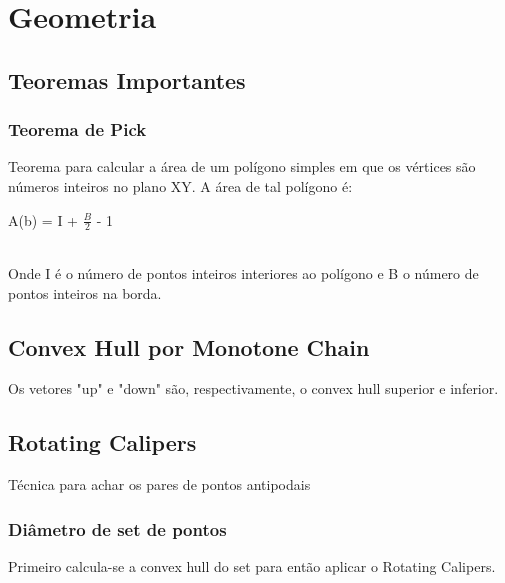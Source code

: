 \section{Geometria}

\subsection{Teoremas Importantes}

\subsubsection{Teorema de Pick}
Teorema para calcular a \'{a}rea de um pol\'{i}gono simples em que os v\'{e}rtices são n\'{u}meros inteiros no plano XY. A \'{a}rea de tal pol\'{i}gono é: 
\\\centerline{A(b) = I + $\frac{B}{2}$ - 1}
\\Onde I \'{e} o n\'{u}mero de pontos inteiros interiores ao pol\'{i}gono e B o n\'{u}mero de pontos inteiros na borda.

\divisor

\subsection{Convex Hull por Monotone Chain}
Os vetores "up" e "down" s\~{a}o, respectivamente, o convex hull superior e inferior.

\subsection{Rotating Calipers}

T\'{e}cnica para achar os pares de pontos antipodais
\subsubsection{Di\^{a}metro de set de pontos}
Primeiro calcula-se a convex hull do set para ent\~{a}o aplicar o Rotating Calipers.
\divisor
